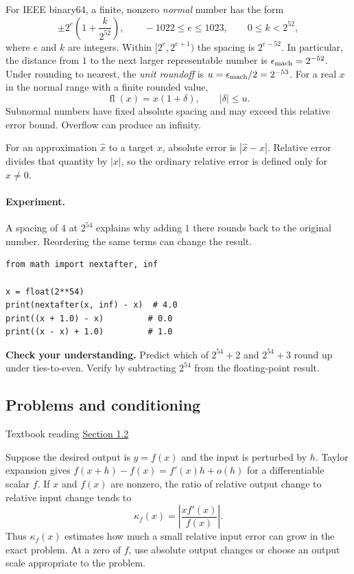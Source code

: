 \documentclass[11pt,letterpaper]{article}
\newcommand{\reading}[2]{\par\smallskip
  {\small Textbook reading \enspace\href{#1}{#2}}\par\medskip}
\DeclareMathOperator{\fl}{fl}
\begin{document}
For IEEE binary64, a finite, nonzero \emph{normal} number has the form
\[
  \pm 2^e \left(1+\frac{k}{2^{52}}\right),
  \qquad
  -1022 \le e \le 1023,\qquad 0 \le k < 2^{52},
\]
where $e$ and $k$ are integers. Within $[2^e,2^{e+1})$ the spacing is
$2^{e-52}$. In particular, the distance from $1$ to the next larger
representable number is $\epsilon_{\rm mach}=2^{-52}$. Under rounding to
nearest, the \emph{unit roundoff} is $u=\epsilon_{\rm mach}/2=2^{-53}$.
For a real $x$ in the normal range with a finite rounded value,
\[
  \fl(x)=x(1+\delta),\qquad |\delta|\le u.
\]
Subnormal numbers have fixed absolute spacing and may exceed this relative
error bound. Overflow can produce an infinity.

For an approximation $\widehat{x}$ to a target $x$, absolute error is
$|\widehat{x}-x|$. Relative error divides that quantity by $|x|$, so the
ordinary relative error is defined only for $x\ne0$.

\paragraph{Experiment.} A spacing of $4$ at $2^{54}$ explains why adding
$1$ there rounds back to the original number. Reordering the same terms
can change the result.

\begin{lstlisting}
from math import nextafter, inf

x = float(2**54)
print(nextafter(x, inf) - x)  # 4.0
print((x + 1.0) - x)         # 0.0
print((x - x) + 1.0)         # 1.0
\end{lstlisting}

\textbf{Check your understanding.} Predict which of $2^{54}+2$ and
$2^{54}+3$ round up under ties-to-even. Verify by subtracting $2^{54}$ from
the floating-point result.

\clearpage
\subsection{Problems and conditioning}
\reading{https://fncbook.com/python/conditioning/}{Section 1.2}

Suppose the desired output is $y=f(x)$ and the input is perturbed by $h$.
Taylor expansion gives $f(x+h)-f(x)=f'(x)h+o(h)$ for a differentiable
scalar $f$. If $x$ and $f(x)$ are nonzero, the ratio of relative output
change to relative input change tends to
\[
   \kappa_f(x)=\left|\frac{x f'(x)}{f(x)}\right|.
\]
Thus $\kappa_f(x)$ estimates how much a small relative input error can
grow in the exact problem. At a zero of $f$, use absolute output changes
or choose an output scale appropriate to the problem.
\end{document}
